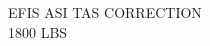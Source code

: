 \begin{figure}[t]
\begin{center}
\begin{perfhdr}EFIS ASI TAS CORRECTION\\
1800 LBS
\end{perfhdr}
\Large


\end{center}
\end{figure}
